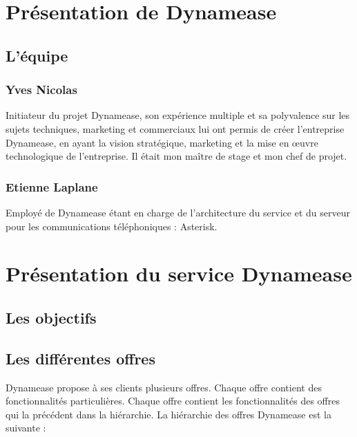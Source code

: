 \section{Présentation de Dynamease}

\subsection{L'équipe}

\subsubsection{Yves Nicolas}
Initiateur du projet Dynamease, son expérience multiple et sa polyvalence sur les sujets techniques, marketing et commerciaux lui ont permis de créer l’entreprise Dynamease, en ayant la vision stratégique, marketing et la mise en œuvre technologique de l’entreprise. Il était mon maître de stage et mon chef de projet.

\subsubsection{Etienne Laplane}
Employé de Dynamease étant en charge de l’architecture du service et du serveur pour les communications téléphoniques : Asterisk.


\section{Présentation du service Dynamease}

\subsection{Les objectifs}

\subsection{Les différentes offres}

Dynamease propose à ses clients plusieurs offres. Chaque offre contient des fonctionnalités particulières. Chaque offre contient les fonctionnalités des offres qui la précédent dans la hiérarchie. La hiérarchie des offres Dynamease est la suivante :

